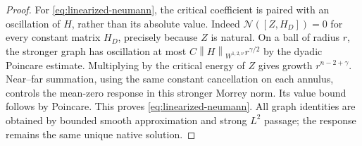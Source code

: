 \documentclass[11pt,a4paper]{article}
\numberwithin{equation}{section}
\theoremstyle{definition}
\theoremstyle{remark}
\newcommand{\norm}[1]{\left\lVert#1\right\rVert}
\begin{document}
\begin{proof}
For \eqref{eq:linearized-neumann}, the critical coefficient is paired
with an oscillation of $H$, rather than its absolute value. Indeed
$\mathcal N([Z,H_D])=0$ for every constant matrix $H_D$, precisely
because $Z$ is natural. On a ball of radius $r$, the stronger graph
has oscillation at most $C\norm H_{W^{1,2,\nu}}r^{\gamma/2}$ by
the dyadic Poincare estimate. Multiplying by the critical energy of
$Z$ gives growth $r^{n-2+\gamma}$. Near--far summation, using the
same constant cancellation on each annulus, controls the mean-zero
response in this stronger Morrey norm. Its value bound follows by
Poincare. This proves \eqref{eq:linearized-neumann}. All graph
identities are obtained by bounded smooth approximation and strong
$L^2$ passage; the response remains the same unique native solution.
\end{proof}
\end{document}
